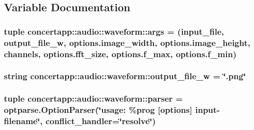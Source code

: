 \subsection{Variable Documentation}
\hypertarget{namespaceconcertapp_1_1audio_1_1waveform_a1e362a69de95f23ed1e9f30988ed1ed0}{
\subsubsection[{args}]{\setlength{\rightskip}{0pt plus 5cm}tuple {\bf concertapp::audio::waveform::args} = (input\_\-file, {\bf output\_\-file\_\-w}, options.image\_\-width, options.image\_\-height, channels, options.fft\_\-size, options.f\_\-max, options.f\_\-min)}}
\label{namespaceconcertapp_1_1audio_1_1waveform_a1e362a69de95f23ed1e9f30988ed1ed0}
\hypertarget{namespaceconcertapp_1_1audio_1_1waveform_a92ef9ae366b0cdb6411aa777bed829f4}{
\subsubsection[{output\_\-file\_\-w}]{\setlength{\rightskip}{0pt plus 5cm}string {\bf concertapp::audio::waveform::output\_\-file\_\-w} = \char`\"{}.png\char`\"{}}}
\label{namespaceconcertapp_1_1audio_1_1waveform_a92ef9ae366b0cdb6411aa777bed829f4}
\hypertarget{namespaceconcertapp_1_1audio_1_1waveform_a02aa23f6042070992773f1489e2f888b}{
\subsubsection[{parser}]{\setlength{\rightskip}{0pt plus 5cm}tuple {\bf concertapp::audio::waveform::parser} = optparse.OptionParser(\char`\"{}usage: \%prog \mbox{[}options\mbox{]} input-\/filename\char`\"{}, conflict\_\-handler=\char`\"{}resolve\char`\"{})}}
\label{namespaceconcertapp_1_1audio_1_1waveform_a02aa23f6042070992773f1489e2f888b}
